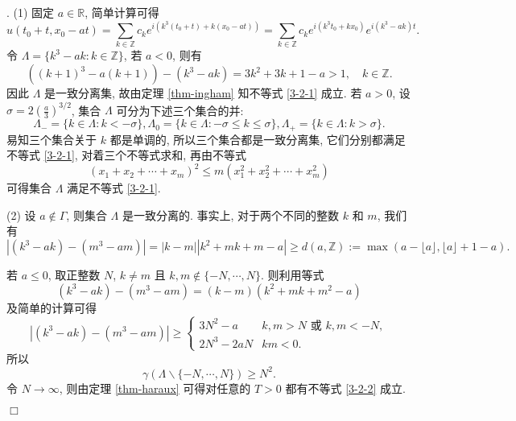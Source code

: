 \documentclass[master]{cugthesis}
\newcommand\R{\ensuremath{\mathbb{R}}}
\newcommand\Z{\ensuremath{\mathbb{Z}}}
\newenvironment{proof}{{\noindent\itshape 证明}.}{\hfill $\Box$\par}
\begin{document}
    \begin{proof}
     (1) 固定 $a\in\R$, 简单计算可得
     \begin{equation}\label{3-2-4}
         u(t_0+t,x_0-at)=\sum_{k\in \Z} c_k e^{i(k^3(t_0+t)+k(x_0-at))}=\sum_{k\in \Z}c_k  e^{i (k^3t_0+kx_0)} e^{i(k^3-ak)t}.
     \end{equation}
    令 $\Lambda=\lbrace k^3-ak: k\in \Z\rbrace$, 若 $a<0$, 则有
    \begin{equation*}
        ((k+1)^3-a(k+1))-(k^3-ak)=3k^2+3k+1-a>1,\quad k\in \Z.
    \end{equation*}
    因此 $\Lambda$ 是一致分离集, 故由定理 \ref{thm-ingham} 知不等式 \eqref{3-2-1} 成立. 若 $a>0$, 设 $\sigma=2\left(\frac{a}{3}\right)^{3 /2}$, 集合 $\Lambda$ 可分为下述三个集合的并:
    \begin{equation*}
        \Lambda_-=\lbrace k\in \Lambda : k<-\sigma\rbrace, \Lambda_0=\lbrace k\in \Lambda : -\sigma\le k\le \sigma\rbrace,\Lambda_+=\lbrace k\in\Lambda: k>\sigma\rbrace.
    \end{equation*}
    易知三个集合关于 $k$ 都是单调的, 所以三个集合都是一致分离集, 它们分别都满足不等式 \eqref{3-2-1}, 对着三个不等式求和, 再由不等式
    \begin{equation*}
        (x_1+x_2+\cdots+x_m)^2\le m (x_1^2+x_2^2+\cdots+x_m^2)
    \end{equation*}
    可得集合 $\Lambda$ 满足不等式 \eqref{3-2-1}.
    
    (2) 设 $a\notin \Gamma$, 则集合 $\Lambda$ 是一致分离的. 事实上, 对于两个不同的整数 $k$ 和 $m$, 我们有
    \begin{equation*}
        |(k^3-ak)-(m^3-am)|=|k-m||k^2+mk+m-a|\ge d(a,\Z):=\max(a-\lfloor a\rfloor,\lfloor a\rfloor +1-a). 
    \end{equation*}
    
    若 $a\le 0$, 取正整数 $N$, $k\neq m$ 且 $k,m\notin\lbrace-N,\cdots, N\rbrace$. 则利用等式
    \begin{equation*}
        (k^3-ak)-(m^3-am)=(k-m)(k^2+mk+m^2-a)
    \end{equation*}
    及简单的计算可得
    \begin{equation}\label{3-22-3}
        \left| (k^3-ak)-(m^3-am) \right|\ge \left\lbrace\begin{array}{ll}
            3N^2-a & k,m> N \text{ 或 } k,m <-N, \\
             2N^3-2aN  & km<0.
        \end{array}\right.
    \end{equation}
    所以
    \begin{equation*}
        \gamma\left(\Lambda \backslash \lbrace-N,\cdots,N\rbrace\right)\ge N^2.
    \end{equation*}
    令 $N\to \infty$, 则由定理 \ref{thm-haraux} 可得对任意的 $T>0$ 都有不等式 \eqref{3-2-2} 成立.
    

\end{proof}
\end{document}
